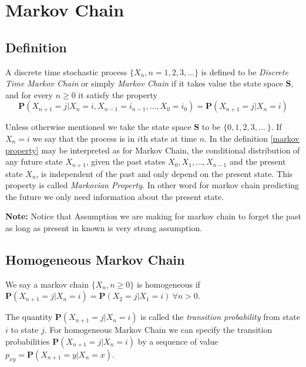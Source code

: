 \chapter{Markov Chain}

\section{Definition}

\begin{definition}
    A discrete time stochastic process $\{X_n,n=1,2,3,\ldots\}$ is defined to be \textit{Discrete Time Markov Chain} or simply \textit{Markov Chain}
    if it takes value  the state space $ \mathbf{S} $, and for every
    $n\ge 0$ it satisfy the property
    \begin{equation}
        \label{markov property}
         \mathbf{P}( X_{n+1} = j | X_n =i , X_{n-1} = i_{n-1}, \ldots, X_0 = i_0 ) = \mathbf{P}( X_{n+1} = j | X_n =i )
    \end{equation}
\end{definition}

Unless otherwise mentioned we take the state space $ \mathbf{S} $ to be $\{0, 1, 2, 3, \ldots\ \} $. 
If $X_n = i $ we say that the process is in $i $th state at time $n$.
In the definition \cref{markov property} may be interpreted as for Markov Chain, the conditional distribution of any future state $ X_{n+1} $, given the past states  $ X_0, X_1,\ldots, X_{n-1} $  and the present state $ X_n $, is independent of the past and only depend on the present state.
This property is called \textit{Markovian Property}. In other word for markov chain predicting the future we only need information about the present state.

\textbf{Note:} Notice that Assumption we are making for markov chain to forget the past as long as present in known is very strong assumption.

\section{Homogeneous Markov Chain}

\begin{definition}
    We say a markov chain $ \{ X_n,n\ge 0 \} $ is homogeneous if $ \mathbf{P}(X_{n+1}=j|X_n=i)=\mathbf{P}(X_2=j|X_1=i) \ \forall n>0 $. 
\end{definition}

The quantity $ \mathbf{P}(X_{n+1}=j|X_n=i) $ is called the \textit{transition probability} from state $i$ to state $j$. For homogeneous Markov Chain 
we can specify the transition probabilities $ \mathbf{P}(X_{n+1}=j|X_{n}=i) $ by a sequence of value $ p_{xy} = \mathbf{P}(X_{n+1}=y|X_{n}=x) $.

